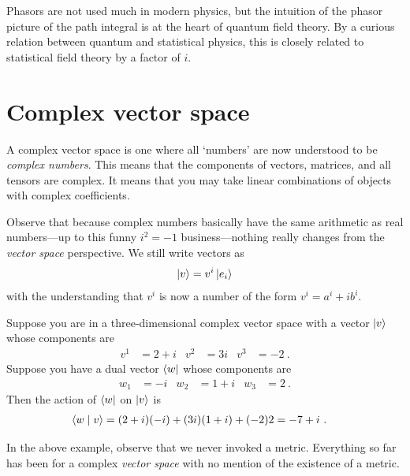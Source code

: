 Phasors are not used much in modern physics, but the intuition of the phasor picture of the path integral is at the heart of quantum field theory. By a curious relation between quantum and statistical physics, this is closely related to statistical field theory by a factor of $i$.



\section{Complex vector space}

A complex vector space is one where all `numbers' are now understood to be \emph{complex numbers}. This means that the components of vectors, matrices, and all tensors are complex. It means that you may take linear combinations of objects with complex coefficients. 

Observe that because complex numbers basically have the same arithmetic as real numbers---up to this funny $i^2=-1$ business---nothing really changes from the \emph{vector space} perspective. We still write vectors as
\begin{align}
    \left|v\right\rangle = v^i\left|e_i\right\rangle
\end{align}
with the understanding that $v^i$ is now a number of the form $v^i = a^i + i b^i$.
\begin{example}
Suppose you are in a three-dimensional  complex vector space with a vector $\left|v\right\rangle$ whose components are
\begin{align}
    v^1 &= 2+i
    &
    v^2 &= 3i
    &
    v^3 &= -2 \ .
\end{align}
Suppose you have a dual vector $\left\langle w\right|$ whose components are
\begin{align}
    w_1 &= -i
    &
    w_2 &= 1+i
    &
    w_3 &= 2 \ .
\end{align}
Then the action of $\left\langle w\right|$ on $\left|v\right\rangle$ is
\begin{align}
    \langle w \mid v \rangle &=
    (2+i)(-i)+(3i)(1+i)+(-2)2 
    =
    -7 + i
    \ . 
\end{align}
\end{example}


In the above example, observe that we never invoked a metric. Everything so far has been for a complex \emph{vector space} with no mention of the existence of a metric. 

